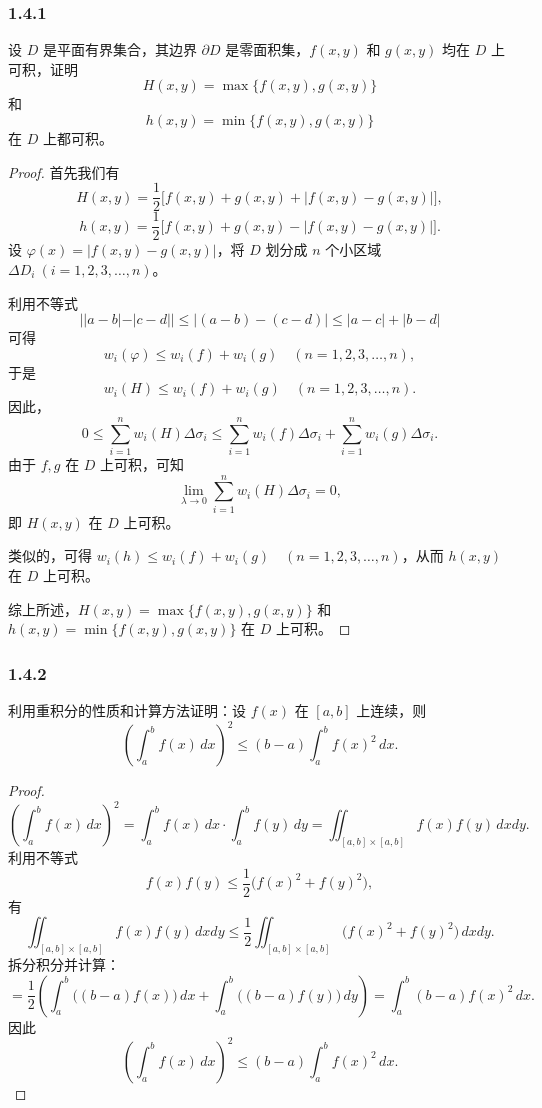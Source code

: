 \documentclass[12pt]{ctexart}
\begin{document}
\subsubsection*{1.4.1}
设 $D$ 是平面有界集合，其边界 $\partial D$ 是零面积集，$f(x, y)$ 和 $g(x, y)$ 均在 $D$ 上可积，证明
\[
H(x, y) = \max\{f(x, y), g(x, y)\}
\]
和
\[
h(x, y) = \min\{f(x, y), g(x, y)\}
\]
在 $D$ 上都可积。
\begin{proof}
首先我们有
\[
H(x, y) = \frac{1}{2} \big[f(x, y) + g(x, y) + |f(x, y) - g(x, y)|\big],
\]
\[
h(x, y) = \frac{1}{2} \big[f(x, y) + g(x, y) - |f(x, y) - g(x, y)|\big].
\]
设 $\varphi(x) = |f(x, y) - g(x, y)|$，将 $D$ 划分成 $n$ 个小区域 $\Delta D_i \ (i=1,2,3,\dots,n)$。

利用不等式
\[
||a - b| - |c - d|| \leq |(a - b) - (c - d)| \leq |a - c| + |b - d|
\]
可得
\[
w_i(\varphi) \leq w_i(f) + w_i(g) \quad (n=1,2,3,\dots,n),
\]
于是
\[
w_i(H) \leq w_i(f) + w_i(g) \quad (n=1,2,3,\dots,n).
\]
因此，
\[
0 \leq \sum_{i=1}^n w_i(H) \Delta \sigma_i \leq \sum_{i=1}^n w_i(f) \Delta \sigma_i + \sum_{i=1}^n w_i(g) \Delta \sigma_i.
\]
由于 $f, g$ 在 $D$ 上可积，可知
\[
\lim_{\lambda \to 0} \sum_{i=1}^n w_i(H) \Delta \sigma_i = 0,
\]
即 $H(x, y)$ 在 $D$ 上可积。

类似的，可得 $w_i(h) \leq w_i(f) + w_i(g) \quad (n=1,2,3,\dots,n)$，从而 $h(x, y)$ 在 $D$ 上可积。

综上所述，$H(x, y) = \max\{f(x, y), g(x, y)\}$ 和 $h(x, y) = \min\{f(x, y), g(x, y)\}$ 在 $D$ 上可积。
\end{proof}

\subsubsection*{1.4.2}
利用重积分的性质和计算方法证明：设 $f(x)$ 在 $[a, b]$ 上连续，则
\[
\left( \int_a^b f(x) \, dx \right)^2 \leq (b-a) \int_a^b f(x)^2 \, dx.
\]
\begin{proof}
\[
\left( \int_a^b f(x) \, dx \right)^2 = \int_a^b f(x) \, dx \cdot \int_a^b f(y) \, dy = \iint_{[a,b] \times [a,b]} f(x)f(y) \, dxdy.
\]
利用不等式
\[
f(x)f(y) \leq \frac{1}{2} \big(f(x)^2 + f(y)^2\big),
\]
有
\[
\iint_{[a,b] \times [a,b]} f(x)f(y) \, dxdy \leq \frac{1}{2} \iint_{[a,b] \times [a,b]} \big(f(x)^2 + f(y)^2\big) \, dxdy.
\]
拆分积分并计算：
\[
= \frac{1}{2} \left( \int_a^b \big((b-a)f(x)\big) \, dx + \int_a^b \big((b-a)f(y)\big) \, dy \right)
= \int_a^b (b-a)f(x)^2 \, dx.
\]
因此
\[
\left( \int_a^b f(x) \, dx \right)^2 \leq (b-a) \int_a^b f(x)^2 \, dx.
\]
\end{proof}
\end{document}
